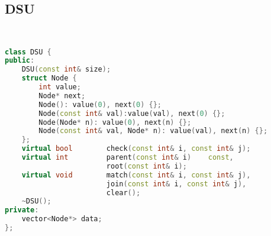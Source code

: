 \subsection{DSU}
\begin{lstlisting}[language=C++]


class DSU {
public:
    DSU(const int& size);
    struct Node {
        int value;
        Node* next;
        Node(): value(0), next(0) {};
        Node(const int& val):value(val), next(0) {};
        Node(Node* n): value(0), next(n) {};
        Node(const int& val, Node* n): value(val), next(n) {};
    };
    virtual bool        check(const int& i, const int& j);
    virtual int         parent(const int& i)    const,
                        root(const int& i);
    virtual void        match(const int& i, const int& j),
                        join(const int& i, const int& j),
                        clear();
    ~DSU();
private:
    vector<Node*> data;
};






\end{lstlisting}
